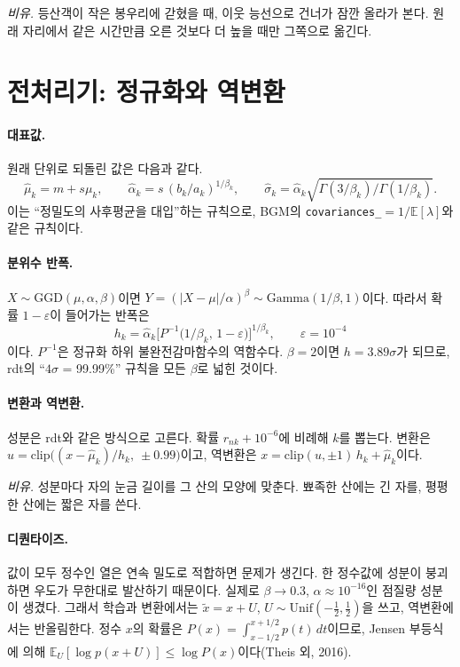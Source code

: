 \documentclass[11pt]{article}
\newcommand{\E}{\mathbb{E}}
\newcommand{\Ga}{\mathrm{Gamma}}
\begin{document}
\emph{비유.} 등산객이 작은 봉우리에 갇혔을 때, 이웃 능선으로 건너가 잠깐 올라가 본다. 원래 자리에서 같은 시간만큼 오른 것보다 더 높을 때만 그쪽으로 옮긴다.

\section{전처리기: 정규화와 역변환}

\paragraph{대표값.}
원래 단위로 되돌린 값은 다음과 같다.
\[
\hat\mu_k=m+s\mu_k,\qquad \hat\alpha_k=s\,(b_k/a_k)^{1/\beta_k},\qquad \hat\sigma_k=\hat\alpha_k\sqrt{\Gamma(3/\beta_k)/\Gamma(1/\beta_k)}.
\]
이는 ``정밀도의 사후평균을 대입''하는 규칙으로, BGM의 \texttt{covariances\_}$=1/\E[\lambda]$와 같은 규칙이다.

\paragraph{분위수 반폭.}
$X\sim\mathrm{GGD}(\mu,\alpha,\beta)$이면 $Y=(|X-\mu|/\alpha)^{\beta}\sim\Ga(1/\beta,1)$이다. 따라서 확률 $1-\varepsilon$이 들어가는 반폭은
\begin{equation}
  h_k=\hat\alpha_k\Big[P^{-1}\big(1/\beta_k,\,1-\varepsilon\big)\Big]^{1/\beta_k},\qquad \varepsilon=10^{-4}
\end{equation}
이다. $P^{-1}$은 정규화 하위 불완전감마함수의 역함수다. $\beta=2$이면 $h=3.89\sigma$가 되므로, rdt의 ``$4\sigma$ = 99.99\%'' 규칙을 모든 $\beta$로 넓힌 것이다.

\paragraph{변환과 역변환.}
성분은 rdt와 같은 방식으로 고른다. 확률 $r_{nk}+10^{-6}$에 비례해 $k$를 뽑는다.
변환은 $u=\mathrm{clip}\big((x-\hat\mu_k)/h_k,\ \pm0.99\big)$이고, 역변환은 $x=\mathrm{clip}(u,\pm1)\,h_k+\hat\mu_k$이다.

\emph{비유.} 성분마다 자의 눈금 길이를 그 산의 모양에 맞춘다. 뾰족한 산에는 긴 자를, 평평한 산에는 짧은 자를 쓴다.

\paragraph{디퀀타이즈.}
값이 모두 정수인 열은 연속 밀도로 적합하면 문제가 생긴다. 한 정수값에 성분이 붕괴하면 우도가 무한대로 발산하기 때문이다. 실제로 $\beta\to0.3$, $\alpha\approx10^{-16}$인 점질량 성분이 생겼다.
그래서 학습과 변환에서는 $\tilde x=x+U$, $U\sim\mathrm{Unif}(-\tfrac12,\tfrac12)$을 쓰고, 역변환에서는 반올림한다.
정수 $x$의 확률은 $P(x)=\int_{x-1/2}^{x+1/2}p(t)\,dt$이므로, Jensen 부등식에 의해 $\E_U[\log p(x+U)]\le\log P(x)$이다(Theis 외, 2016).
\end{document}
